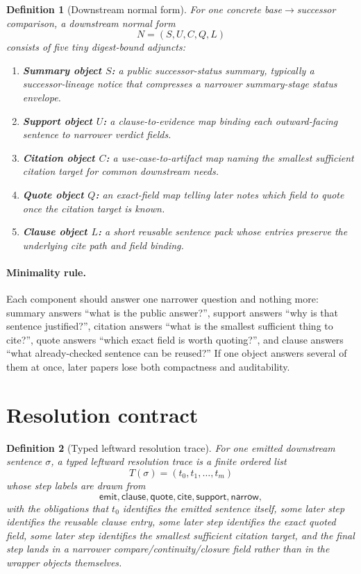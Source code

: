\documentclass[11pt]{article}
\newtheorem{definition}{Definition}
\begin{document}
\begin{definition}[Downstream normal form]
For one concrete base$\to$successor comparison, a \emph{downstream normal form}
\[
N=(S,U,C,Q,L)
\]
consists of five tiny digest-bound adjuncts:
\begin{enumerate}[leftmargin=*]
\item \textbf{Summary object $S$:} a public successor-status summary, typically a successor-lineage notice that compresses a narrower summary-stage status envelope.
\item \textbf{Support object $U$:} a clause-to-evidence map binding each outward-facing sentence to narrower verdict fields.
\item \textbf{Citation object $C$:} a use-case-to-artifact map naming the smallest sufficient citation target for common downstream needs.
\item \textbf{Quote object $Q$:} an exact-field map telling later notes which field to quote once the citation target is known.
\item \textbf{Clause object $L$:} a short reusable sentence pack whose entries preserve the underlying cite path and field binding.
\end{enumerate}
\end{definition}

\paragraph{Minimality rule.}
Each component should answer one narrower question and nothing more:
summary answers ``what is the public answer?'',
support answers ``why is that sentence justified?'',
citation answers ``what is the smallest sufficient thing to cite?'',
quote answers ``which exact field is worth quoting?'',
and clause answers ``what already-checked sentence can be reused?''
If one object answers several of them at once, later papers lose both compactness and auditability.

\section{Resolution contract}

\begin{definition}[Typed leftward resolution trace]
For one emitted downstream sentence $\sigma$, a \emph{typed leftward resolution trace} is a finite ordered list
\[
T(\sigma)=(t_0,t_1,\dots,t_m)
\]
whose step labels are drawn from
\[
\textsf{emit},\textsf{clause},\textsf{quote},\textsf{cite},\textsf{support},\textsf{narrow},
\]
with the obligations that $t_0$ identifies the emitted sentence itself, some later step identifies the reusable clause entry, some later step identifies the exact quoted field, some later step identifies the smallest sufficient citation target, and the final step lands in a narrower compare/continuity/closure field rather than in the wrapper objects themselves.
\end{definition}
\end{document}
